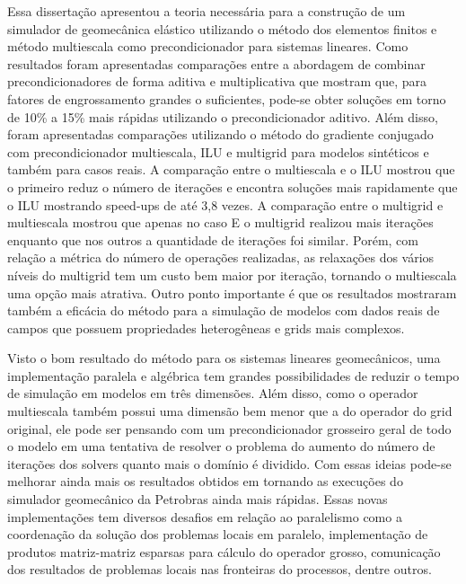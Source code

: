 
Essa dissertação apresentou a teoria necessária para a construção de um simulador de geomecânica elástico utilizando o método dos elementos finitos e método multiescala como precondicionador para sistemas lineares. Como resultados foram apresentadas comparações entre a abordagem de combinar precondicionadores de forma aditiva e multiplicativa que mostram que, para fatores de engrossamento grandes o suficientes, pode-se obter soluções em torno de 10\% a 15\%  mais rápidas utilizando o precondicionador aditivo. Além disso, foram apresentadas comparações utilizando o método do gradiente conjugado com precondicionador  multiescala, ILU e multigrid para modelos sintéticos e também para casos reais. A comparação entre o multiescala e o ILU mostrou que o primeiro reduz o número de iterações e encontra soluções mais rapidamente que o ILU mostrando speed-ups de até 3,8 vezes. A comparação entre o multigrid e multiescala mostrou que apenas no caso E o multigrid realizou mais iterações enquanto que nos outros a quantidade de iterações foi similar. Porém, com relação a métrica do número de operações realizadas, as relaxações dos vários níveis do multigrid  tem um custo bem maior por iteração, tornando o multiescala uma opção mais atrativa.  Outro ponto importante é que os resultados mostraram também a eficácia do método para a simulação de modelos com dados reais de campos que possuem propriedades heterogêneas e grids mais complexos. 

Visto o bom resultado do método para os sistemas lineares geomecânicos, uma implementação paralela e algébrica tem grandes possibilidades de reduzir o tempo de simulação em modelos em três dimensões. Além disso, como o operador multiescala também possui uma dimensão bem menor que a do operador do grid original, ele pode ser pensando com um precondicionador grosseiro geral de todo o modelo em uma tentativa de resolver o problema do aumento do número de iterações dos solvers quanto mais o domínio é dividido. Com essas ideias pode-se melhorar ainda mais os resultados obtidos em \citet{geomecrio} tornando as execuções do simulador geomecânico da Petrobras ainda mais rápidas. Essas novas implementações tem diversos desafios em relação ao paralelismo como a coordenação da solução dos problemas locais em paralelo, implementação de produtos matriz-matriz esparsas para  cálculo do operador grosso, comunicação dos resultados de problemas locais nas fronteiras do processos, dentre outros.


